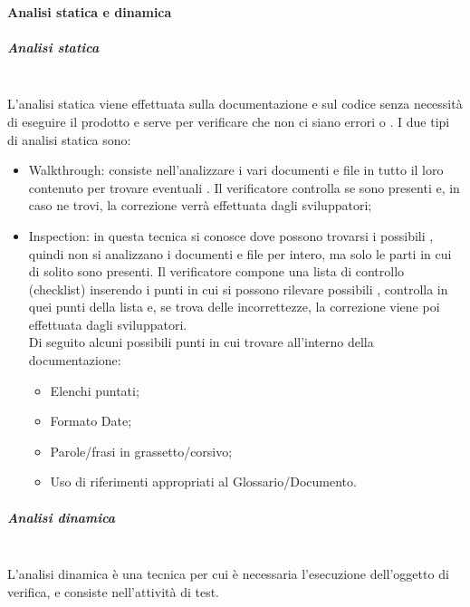        \paragraph{Analisi statica e dinamica}
            \subparagraph{Analisi statica}\mbox{}\\
                L'analisi statica viene effettuata sulla documentazione e sul codice senza necessità di eseguire il prodotto e serve per verificare che non ci siano errori o . I due tipi di analisi statica sono:
                \begin{itemize}
                    \item Walkthrough: consiste nell'analizzare i vari documenti e file in tutto il loro contenuto per trovare eventuali . Il verificatore controlla se sono presenti  e, in caso ne trovi, la correzione verrà effettuata dagli sviluppatori; 
                    \item Inspection: in questa tecnica si conosce dove possono trovarsi i possibili , quindi non si analizzano i documenti e file per intero, ma solo le parti in cui di solito sono presenti. Il verificatore compone una lista di controllo (checklist) inserendo i punti in cui si possono rilevare possibili , controlla in quei punti della lista e, se trova delle incorrettezze, la correzione viene poi effettuata dagli sviluppatori. \\
			Di seguito alcuni possibili punti in cui trovare  all'interno della documentazione:
			\begin{itemize}
				\item Elenchi puntati;
				\item Formato Date;
				\item Parole/frasi in grassetto/corsivo;
				\item Uso di riferimenti appropriati al Glossario/Documento.
			\end{itemize}
                \end{itemize}
            \subparagraph{Analisi dinamica}\mbox{}\\
		L'analisi dinamica è una tecnica per cui è necessaria l'esecuzione dell'oggetto di verifica, e consiste nell'attività di test.

